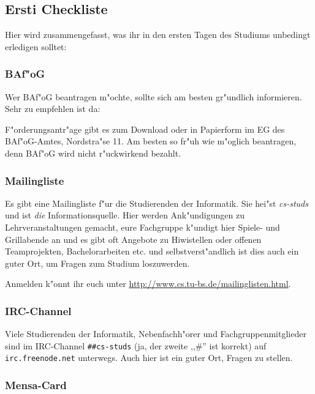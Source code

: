 \subsection{Ersti Checkliste}

Hier wird zusammengefasst, was ihr in den ersten Tagen des Studiums
unbedingt erledigen solltet:

\subsubsection{BAf"oG}

Wer BAf"oG beantragen m"ochte, sollte sich am besten gr"undlich
informieren. Sehr zu empfehlen ist da: \\
\mbox{}
 
F"orderungsantr"age gibt es zum Download oder in Papierform im
EG des BAf"oG-Amtes, Nordstra"se 11. Am besten so fr"uh
wie m"oglich beantragen, denn BAf"oG wird nicht r"uckwirkend
bezahlt.

\subsubsection{Mailingliste}

Es gibt eine Mailingliste f"ur die Studierenden der Informatik.
Sie hei"st \emph{cs-studs} und ist \emph{die} Informationsquelle.
Hier werden Ank"undigungen zu Lehrveranstaltungen gemacht, eure
Fachgruppe k"undigt hier Spiele- und Grillabende an und es gibt
oft Angebote zu Hiwistellen oder offenen Teamprojekten,
Bachelorarbeiten etc. und selbstverst"andlich ist dies auch ein
guter Ort, um Fragen zum Studium loszuwerden.

Anmelden k"onnt ihr euch unter
\url{http://www.cs.tu-bs.de/mailinglisten.html}.

\subsubsection{IRC-Channel}

Viele Studierenden der Informatik, Nebenfachh"orer und
Fachgruppenmitglieder sind im IRC-Channel \texttt{\#\#cs-studs}
(ja, der zweite ,,\#'' ist korrekt) auf \texttt{irc.freenode.net}
unterwegs. Auch hier ist ein guter Ort, Fragen zu stellen.

\subsubsection{Mensa-Card}

